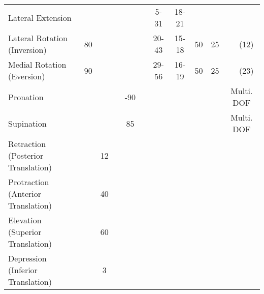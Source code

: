 \begin{sidewaystable}
{\begin{tabular}{l c c c c c c c c c c c}
			Lateral Extension                    & \textendash & \textendash     & \textendash & \textendash      & \textendash           & 5-31\textdegree                 & 18-21\textdegree                & \textendash & \textendash           & \textendash & \textendash      \\
			Lateral Rotation (Inversion)         & 80\textdegree         & \textendash     & \textendash & \textendash      & \textendash           & 20-43\textdegree                & 15-18\textdegree                & 50\textdegree         & 25\textdegree                   & \textendash & (12\textdegree)            \\
			Medial Rotation (Eversion)           & 90\textdegree         & \textendash     & \textendash & \textendash      & \textendash           & 29-56\textdegree                & 16-19\textdegree                & 50\textdegree         & 25\textdegree                   & \textendash & (23\textdegree)            \\
			Pronation                            & \textendash & \textendash     & \textendash & -90\textdegree             & \textendash           & \textendash           & \textendash           & \textendash & \textendash           & \multicolumn{2}{c}{Multi. DOF} \\
			Supination                           & \textendash & \textendash     & \textendash & 85\textdegree              & \textendash           & \textendash           & \textendash           & \textendash & \textendash           & \multicolumn{2}{c}{Multi. DOF} \\
			Retraction (Posterior Translation)   & \textendash & 12\textdegree             & \textendash & \textendash      & \textendash           & \textasteriskcentered & \textasteriskcentered & \textendash & \textasteriskcentered & \textendash & \textendash      \\
			Protraction (Anterior Translation)   & \textendash & 40\textdegree             & \textendash & \textendash      & \textendash           & \textasteriskcentered & \textasteriskcentered & \textendash & \textasteriskcentered & \textendash & \textendash      \\
			Elevation (Superior Translation)     & \textendash & 60\textdegree             & \textendash & \textendash      & \textendash           & \textasteriskcentered & \textasteriskcentered & \textendash & \textasteriskcentered & \textendash & \textendash      \\
			Depression (Inferior Translation)    & \textendash & 3\textdegree              & \textendash & \textendash      & \textendash           & \textasteriskcentered & \textasteriskcentered & \textendash & \textasteriskcentered & \textendash & \textendash      \\

\end{tabular}}
\end{sidewaystable}
